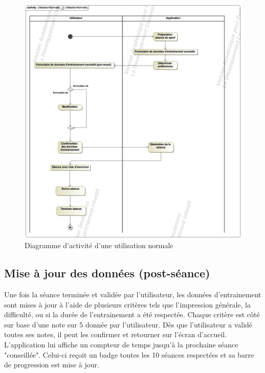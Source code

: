 \newpage

\begin{figure}[!h]
\includegraphics[scale=0.3]{diagrams/utilisation}
\centering
\caption{Diagramme d'activité d'une utilisation normale}
\end{figure}


\subsection*{Mise à jour des données (post-séance)}

Une fois la séance terminée et validée par l'utilisateur, les données d'entrainement sont mises à jour à l'aide de plusieurs critères tels que l'impression générale, la difficulté, ou si la durée de l'entrainement a été respectée. Chaque critère est côté sur base d'une note sur 5 donnée par l'utilisateur. Dès que l'utilisateur a validé toutes ses notes, il peut les confirmer et retourner sur l'écran d'accueil. L'application lui affiche un compteur de temps jusqu'à la prochaine séance "conseillée". Celui-ci reçoit un badge toutes les 10 séances respectées et sa barre de progression est mise à jour.  

